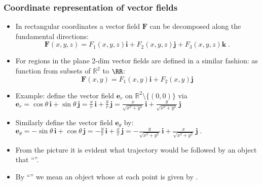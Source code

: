 \begin{frame}
\frametitle{Coordinate representation of vector fields}

\begin{itemize}
\item<1-> In rectangular coordinates a vector field $\textbf{F}$ can
be decomposed along the fundamental directions:
$$
\textbf{F}(x,y,z) = F_1(x,y,z) \textbf{i} + F_2(x,y,z) \textbf{j} + F_3(x,y,z) \textbf{k} \; .
$$
\item<2-> For regions in the plane 2-dim vector fields are defined in a similar fashion: as function from subsets of $\mathbb R^2$ to $\RR$:
$$
\textbf{F}(x,y) = F_1(x,y) \textbf{i} + F_2(x,y) \textbf{j}
$$


\end{itemize}
\end{frame}
\begin{frame}
\begin{itemize}
\item<1-> Example: define the vector field $\textbf{e}_r$ on $\mathbb{R}^2 \setminus \{ (0,0)\}$ via
$
\textbf{e}_r = \cos\theta\, \textbf{i} +
\sin\theta \,\textbf{j} = \frac{x}{r} \, \textbf{i} +
\frac{y}{r} \, \textbf{j} = \frac{x}{\sqrt{x^2+y^2}} \,
\textbf{i} + \frac{y}{\sqrt{x^2+y^2}} \, \textbf{j}
$

\item<2-> Similarly define the vector field $\textbf{e}_{\theta}$ by:
$\textbf{e}_\theta = -\sin\theta\, \textbf{i} +
\cos\theta \,\textbf{j} = -\frac{y}{r} \, \textbf{i} +
\frac{x}{r} \, \textbf{j} = -\frac{y}{\sqrt{x^2+y^2}} \,
\textbf{i} + \frac{x}{\sqrt{x^2+y^2}} \, \textbf{j} \; .
$

\hfil \hfil{}
\item<4-> From the picture it is evident what trajectory would be followed by an object that ``''.
\item<5-> By ``'' we mean an object whose  at each point is given by .
\end{itemize}
\end{frame}

